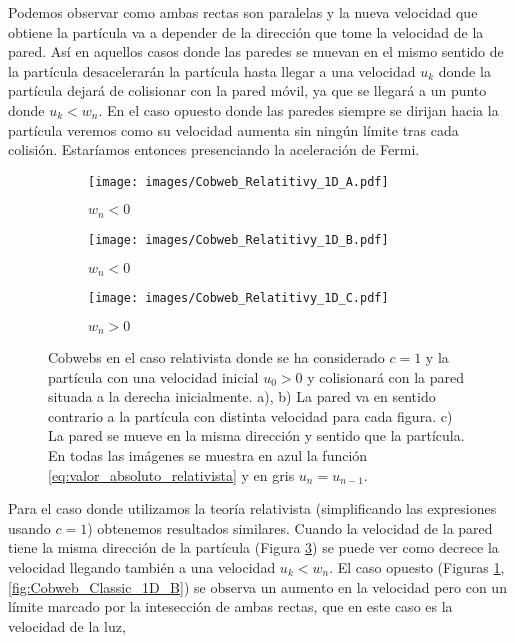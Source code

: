 \documentclass[11pt, spanish]{book}
\begin{document}
Podemos observar como ambas rectas son paralelas y la nueva velocidad que obtiene la partícula va a depender de la dirección que tome la velocidad de la pared. Así en aquellos casos donde las paredes se muevan en el mismo sentido de la partícula desacelerarán la partícula hasta llegar a una velocidad \( u_k \) donde la partícula dejará de colisionar con la pared móvil, ya que se llegará a un punto donde \( u_k < w_n \). En el caso opuesto donde las paredes siempre se dirijan hacia la partícula veremos como su velocidad aumenta sin ningún límite tras cada colisión. Estaríamos entonces presenciando la aceleración de Fermi.

\vspace{3mm}

\begin{figure}[H]
    \centering
    \begin{subfigure}[b]{0.3\textwidth}
        \centering
        \texttt{[image: images/Cobweb\_Relatitivy\_1D\_A.pdf]}
        \caption{$w_n<0$}
        \label{fig:Cobweb_Rel_1D_A}
    \end{subfigure}
    \hfill
    \begin{subfigure}[b]{0.3\textwidth}
        \centering
        \texttt{[image: images/Cobweb\_Relatitivy\_1D\_B.pdf]}
        \caption{$w_n<0$}
        \label{fig:Cobweb_Rel_1D_B}
    \end{subfigure}
    \hfill
    \begin{subfigure}[b]{0.3\textwidth}
        \centering
        \texttt{[image: images/Cobweb\_Relatitivy\_1D\_C.pdf]}
        \caption{$w_n>0$}
        \label{fig:Cobweb_Rel_1D_C}
    \end{subfigure}
    \caption{Cobwebs en el caso relativista donde se ha considerado \( c=1 \) y la partícula  con una velocidad inicial $u_0 > 0$ y colisionará con la pared situada a la derecha inicialmente. a), b) La pared va en sentido contrario a la partícula con distinta velocidad para cada figura. c) La pared se mueve en la misma dirección y sentido que la partícula. En todas las imágenes se muestra en azul la función \ref{eq:valor_absoluto_relativista} y en gris \( u_n = u_{n-1} \).}
        \label{fig:Cobweb_Rel_1D}
\end{figure}

Para el caso donde utilizamos la teoría relativista (simplificando las expresiones usando \( c = 1\)) obtenemos resultados similares. Cuando la velocidad de la pared tiene la misma dirección de la partícula (Figura \ref{fig:Cobweb_Rel_1D_C}) se puede ver como decrece la velocidad llegando también a una velocidad \( u_k < w_n \). El caso opuesto (Figuras \ref{fig:Cobweb_Rel_1D_A}, \ref{fig:Cobweb_Classic_1D_B}) se observa un aumento en la velocidad pero con un límite marcado por la intesección de ambas rectas, que en este caso es la velocidad de la luz,
\end{document}
